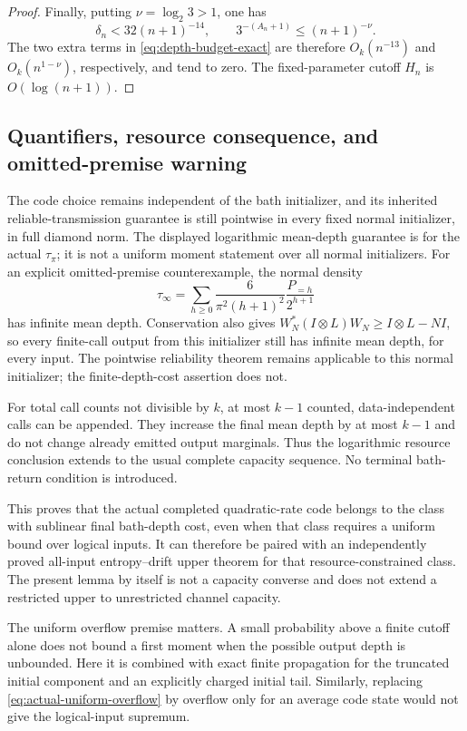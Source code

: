\begin{proof}
Finally, putting $\nu=\log_2 3>1$, one has
\[
 \delta_n<32(n+1)^{-14},\qquad
 3^{-(A_n+1)}\le(n+1)^{-\nu}.
\]
The two extra terms in \eqref{eq:depth-budget-exact} are therefore
$O_k(n^{-13})$ and $O_k(n^{1-\nu})$, respectively, and tend to zero.
The fixed-parameter cutoff $H_n$ is $O(\log(n+1))$.
\end{proof}

\subsection{Quantifiers, resource consequence, and omitted-premise warning}

The code choice remains independent of the bath initializer, and its
inherited reliable-transmission guarantee is still pointwise in every
fixed normal initializer, in full diamond norm. The displayed
logarithmic mean-depth guarantee is for the actual $\tau_\pi$; it is
not a uniform moment statement over all normal initializers. For an
explicit omitted-premise counterexample, the normal density
\[
 \tau_\infty=\sum_{h\ge0}\frac{6}{\pi^2(h+1)^2}
             \frac{P_{=h}}{2^{h+1}}
\]
has infinite mean depth. Conservation also gives
$W_N^*(I\otimes L)W_N\ge I\otimes L-NI$, so every finite-call output
from this initializer still has infinite mean depth, for every input.
The pointwise reliability theorem remains applicable to this normal
initializer; the finite-depth-cost assertion does not.

For total call counts not divisible by $k$, at most $k-1$ counted,
data-independent calls can be appended. They increase the final mean
depth by at most $k-1$ and do not change already emitted output marginals.
Thus the logarithmic resource conclusion extends to the usual complete
capacity sequence. No terminal bath-return condition is introduced.

This proves that the actual completed quadratic-rate code belongs to
the class with sublinear final bath-depth cost, even when that class
requires a uniform bound over logical inputs. It can therefore be paired
with an independently proved all-input entropy--drift upper theorem for
that resource-constrained class. The present lemma by itself is not a
capacity converse and does not extend a restricted upper to unrestricted
channel capacity.

The uniform overflow premise matters. A small probability above a finite
cutoff alone does not bound a first moment when the possible output depth
is unbounded. Here it is combined with exact finite propagation for the
truncated initial component and an explicitly charged initial tail.
Similarly, replacing \eqref{eq:actual-uniform-overflow} by overflow only
for an average code state would not give the logical-input supremum.
